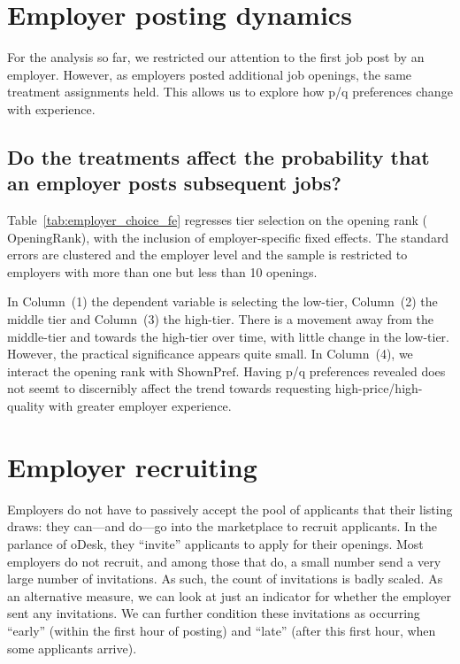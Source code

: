 \documentclass[prodmode,acmec]{ec-acmsmall}
\newcommand{\important}[1]{#1}
\begin{document}

\section{Employer posting dynamics} 
\label{sec:dynamics} 
For the analysis so far, we restricted our attention to the first job post by an employer.
However, as employers posted additional job openings, the same treatment assignments held.
This allows us to explore how p/q preferences change with experience. 

\subsection{Do the treatments affect the probability that an employer posts subsequent jobs?}

Table~\ref{tab:employer_choice_fe} regresses tier selection on the opening rank ($\mbox{OpeningRank}$), with the inclusion of employer-specific fixed effects.
The standard errors are clustered and the employer level and the sample is restricted to employers with more than one but less than 10 openings.

In Column~(1) the dependent variable is selecting the low-tier, Column~(2) the middle tier and Column~(3) the high-tier.
\important{There is a movement away from the middle-tier and towards the high-tier over time, with little change in the low-tier. However, the practical significance appears quite small.}
In Column~(4), we interact the opening rank with $\mbox{ShownPref}$. 
\important{Having p/q preferences revealed does not seemt to discernibly affect the trend towards requesting high-price/high-quality with greater employer experience.}





\section{Employer recruiting}  \label{sec:employer_recruiting}
Employers do not have to passively accept the pool of applicants that their listing draws: 
they can---and do---go into the marketplace to recruit applicants. 
In the parlance of oDesk, they ``invite'' applicants to apply for their openings. 
Most employers do not recruit, and among those that do, a small number send a very large number of invitations. 
As such, the count of invitations is badly scaled. 
As an alternative measure, we can look at just an indicator for whether the employer sent any invitations. 
We can further condition these invitations as occurring ``early'' (within the first hour of posting) and ``late'' (after this first hour, when some applicants arrive). 
\end{document}
